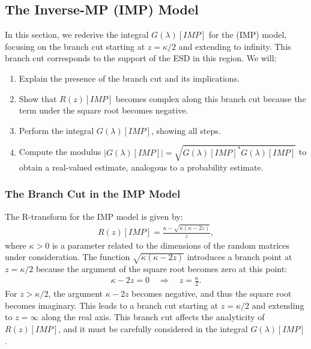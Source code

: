 \subsection{The Inverse-MP (IMP) Model}
\label{sxn:IMP}
In this section, we rederive the integral $G(\lambda)[IMP]$ for the \InverseMP (IMP) model, focusing on the branch cut starting at $z = \kappa/2$ and extending to infinity. 
This branch cut corresponds to the support of the ESD in this region. 
We will:
\begin{enumerate}
\item Explain the presence of the branch cut and its implications.
\item Show that $R(z)[IMP]$ becomes complex along this branch cut because the term under the square root becomes negative.
\item Perform the integral $G(\lambda)[IMP]$, showing all steps.
\item Compute the modulus $|G(\lambda)[IMP]| = \sqrt{ G(\lambda)[IMP]^* G(\lambda)[IMP] }$ to obtain a real-valued estimate, analogous to a probability estimate.
\end{enumerate}

\subsubsection{The Branch Cut in the IMP Model}

The R-transform for the IMP model is given by:
\begin{align}
\label{eqn:iw_r_transf}
R(z)[IMP] = \frac{\kappa - \sqrt{\kappa(\kappa - 2z)}}{z},
\end{align}
where $\kappa > 0$ is a parameter related to the dimensions of the random matrices under consideration.
The function $\sqrt{\kappa(\kappa - 2z)}$ introduces a branch point at $z = \kappa/2$ because the argument of the square root becomes zero at this point:
\begin{align}
\kappa - 2z = 0 \quad \Rightarrow \quad z = \frac{\kappa}{2}.
\end{align}
For $z > \kappa/2$, the argument $\kappa - 2z$ becomes negative, and thus the square root becomes imaginary. 
This leads to a branch cut starting at $z = \kappa/2$ and extending to $z = \infty$ along the real axis. 
This branch cut affects the analyticity of $R(z)[IMP]$, and it must be carefully considered in the integral $G(\lambda)[IMP]$.

